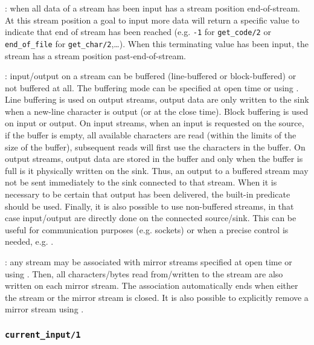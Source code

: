 : when all data of a stream
 has been input  has a stream position
end-of-stream. At this stream position a goal to input more data will return
a specific value to indicate that end of stream has been reached (e.g.
\texttt{-1} for \texttt{get\_code/2} or \texttt{end\_of\_file} for
\texttt{get\_char/2},\ldots). When this terminating value has been input, the
stream has a stream position past-end-of-stream.

: input/output on a stream can be buffered
(line-buffered or block-buffered) or not buffered at all. The buffering mode
can be specified at open time or using 
. Line buffering is used on output streams,
output data are only written to the sink when a new-line character is output
(or at the close time). Block buffering is used on input or output. On input
streams, when an input is requested on the source, if the buffer is empty,
all available characters are read (within the limits of the size of the
buffer), subsequent reads will first use the characters in the buffer. On
output streams, output data are stored in the buffer and only when the
buffer is full is it physically written on the sink. Thus, an output to a
buffered stream may not be sent immediately to the sink connected to that
stream. When it is necessary to be certain that output has been delivered,
the built-in predicate  
should be used. Finally, it is also possible to use non-buffered streams, in
that case input/output are directly done on the connected source/sink. This
can be useful for communication purposes (e.g. sockets) or when a precise
control is needed, e.g.  .

: any stream may be associated with mirror streams
specified at open time or using 
. Then, all characters/bytes read from/written to
the stream are also written on each mirror stream.  The association
automatically ends when either the stream or the mirror stream is closed. It
is also possible to explicitly remove a mirror stream using
.


\subsubsection{\texttt{current\_input/1}}

